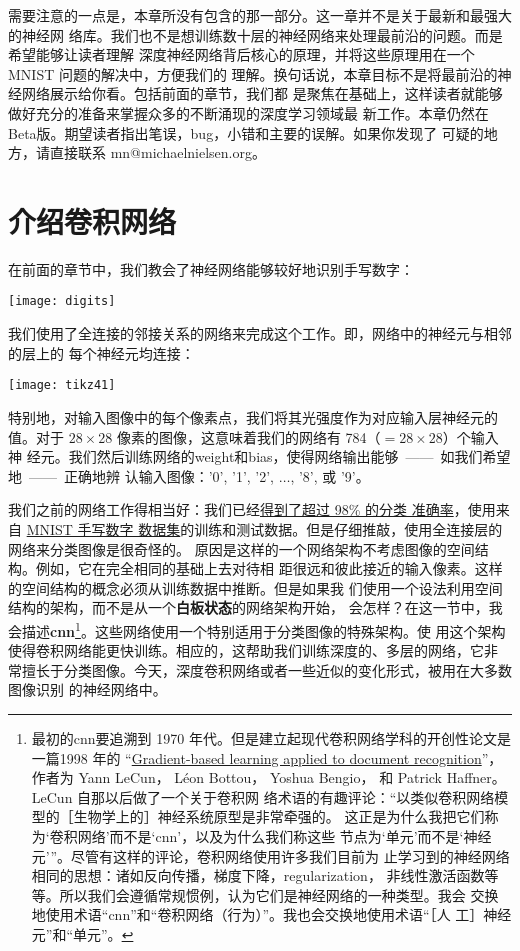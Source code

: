 需要注意的一点是，本章所没有包含的那一部分。这一章并不是关于最新和最强大的神经网
络库。我们也不是想训练数十层的神经网络来处理最前沿的问题。而是希望能够让读者理解
深度神经网络背后核心的原理，并将这些原理用在一个 MNIST 问题的解决中，方便我们的
理解。换句话说，本章目标不是将最前沿的神经网络展示给你看。包括前面的章节，我们都
是聚焦在基础上，这样读者就能够做好充分的准备来掌握众多的不断涌现的深度学习领域最
新工作。本章仍然在Beta版。期望读者指出笔误，bug，小错和主要的误解。如果你发现了
可疑的地方，请直接联系 mn@michaelnielsen.org。

\section{介绍卷积网络}
\label{sec:convolutional_networks}

在前面的章节中，我们教会了神经网络能够较好地识别手写数字：
\begin{center}
  \texttt{[image: digits]}
\end{center}

我们使用了全连接的邻接关系的网络来完成这个工作。即，网络中的神经元与相邻的层上的
每个神经元均连接：
\begin{center}
  \texttt{[image: tikz41]}
\end{center}

特别地，对输入图像中的每个像素点，我们将其光强度作为对应输入层神经元的值。对于
$28 \times 28$ 像素的图像，这意味着我们的网络有 784（$= 28 \times 28$）个输入神
经元。我们然后训练网络的\gls*{weight}和\gls*{bias}，使得网络输出能够~——~如我们希望地~——~正确地辨
认输入图像：'0', '1', '2', $\ldots$, '8', 或 '9'。

我们之前的网络工作得相当好：我们已经\hyperref[98percent]{得到了超过 98\% 的分类
  准确率}，使用来自 \hyperref[sec:learning_with_gradient_descent]{MNIST 手写数字
  数据集}的训练和测试数据。但是仔细推敲，使用全连接层的网络来分类图像是很奇怪的。
原因是这样的一个网络架构不考虑图像的空间结构。例如，它在完全相同的基础上去对待相
距很远和彼此接近的输入像素。这样的空间结构的概念必须从训练数据中推断。但是如果我
们使用一个设法利用空间结构的架构，而不是从一个\textbf{白板状态}的网络架构开始，
会怎样？在这一节中，我会描述\textbf{\gls{cnn}}\footnote{最初的\gls*{cnn}要追溯到
  1970 年代。但是建立起现代卷积网络学科的开创性论文是一篇1998 年的
  “\href{http://yann.lecun.com/exdb/publis/pdf/lecun-98.pdf}{Gradient-based
    learning applied to document recognition}”，作者为 Yann LeCun， Léon
  Bottou， Yoshua Bengio， 和 Patrick Haffner。LeCun 自那以后做了一个关于卷积网
  络术语的有趣评论：“以类似卷积网络模型的［生物学上的］神经系统原型是非常牵强的。
  这正是为什么我把它们称为‘卷积网络’而不是‘\gls*{cnn}’，以及为什么我们称这些
  节点为‘单元’而不是‘神经元’”。尽管有这样的评论，卷积网络使用许多我们目前为
  止学习到的神经网络相同的思想：诸如反向传播，梯度下降，\gls*{regularization}，
  非线性激活函数等等。所以我们会遵循常规惯例，认为它们是神经网络的一种类型。我会
  交换地使用术语“\gls*{cnn}”和“卷积网络（行为）”。我也会交换地使用术语“［人
    工］神经元”和“单元”。}。这些网络使用一个特别适用于分类图像的特殊架构。使
用这个架构使得卷积网络能更快训练。相应的，这帮助我们训练深度的、多层的网络，它非
常擅长于分类图像。今天，深度卷积网络或者一些近似的变化形式，被用在大多数图像识别
的神经网络中。

